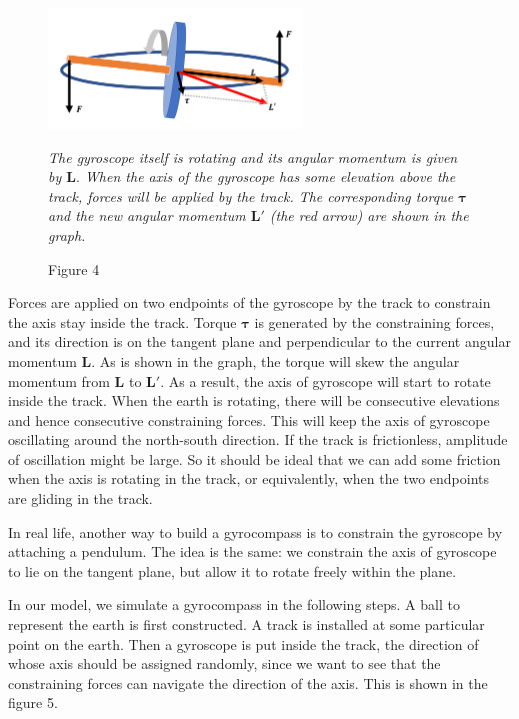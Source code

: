 \documentclass[12pt]{article}
\renewcommand{\(}{\left (}
\renewcommand{\)}{\right )}
\renewcommand{\vec}[1]{\boldsymbol{#1}}
\begin{document}
\begin {figure}[ht]
	\centering
	\includegraphics[width=0.6\textwidth]{gyrocompass_physics.png}
	\caption*{\small Figure 4}
	\footnotesize
	\emph{The gyroscope itself is rotating and its angular momentum is given by $\vec{L}.$ When the axis of the gyroscope has some elevation above the track, forces will be applied by the track. The corresponding torque $\vec{\tau}$ and the new angular momentum $\vec{L'}$ (the red arrow) are shown in the graph. }
\end {figure}

Forces are applied on two endpoints of the gyroscope by the track to constrain the axis stay inside the track. Torque $\vec{\tau}$ is generated by the constraining forces, and its direction is on the tangent plane and perpendicular to the current angular momentum $\vec{L}$. As is shown in the graph, the torque will skew the angular momentum from $\vec{L}$ to $\vec{L'}.$ As a result, the axis of gyroscope will start to rotate inside the track. When the earth is rotating, there will be consecutive elevations and hence consecutive constraining forces. This will keep the axis of gyroscope oscillating around the north-south direction. If the track is frictionless, amplitude of oscillation might be large. So it should be ideal that we can add some friction when the axis is rotating in the track, or equivalently, when the two endpoints are gliding in the track.

In real life, another way to build a gyrocompass is to constrain the gyroscope by attaching a pendulum. The idea is the same: we constrain the axis of gyroscope to lie on the tangent plane, but allow it to rotate freely within the plane.

In our model, we simulate a gyrocompass in the following steps. A ball to represent the earth is first constructed. A track is installed at some particular point on the earth. Then a gyroscope is put inside the track, the direction of whose axis should be assigned randomly, since we want to see that the constraining forces can navigate the direction of the axis. This is shown in the figure 5.
\end{document}
